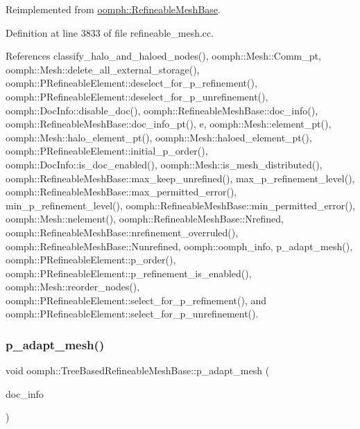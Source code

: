 Reimplemented from \hyperlink{classoomph_1_1RefineableMeshBase_a03222065e7dfe9eac96fbd58faf0e4ab}{oomph\+::\+Refineable\+Mesh\+Base}.



Definition at line 3833 of file refineable\+\_\+mesh.\+cc.



References classify\+\_\+halo\+\_\+and\+\_\+haloed\+\_\+nodes(), oomph\+::\+Mesh\+::\+Comm\+\_\+pt, oomph\+::\+Mesh\+::delete\+\_\+all\+\_\+external\+\_\+storage(), oomph\+::\+P\+Refineable\+Element\+::deselect\+\_\+for\+\_\+p\+\_\+refinement(), oomph\+::\+P\+Refineable\+Element\+::deselect\+\_\+for\+\_\+p\+\_\+unrefinement(), oomph\+::\+Doc\+Info\+::disable\+\_\+doc(), oomph\+::\+Refineable\+Mesh\+Base\+::doc\+\_\+info(), oomph\+::\+Refineable\+Mesh\+Base\+::doc\+\_\+info\+\_\+pt(), e, oomph\+::\+Mesh\+::element\+\_\+pt(), oomph\+::\+Mesh\+::halo\+\_\+element\+\_\+pt(), oomph\+::\+Mesh\+::haloed\+\_\+element\+\_\+pt(), oomph\+::\+P\+Refineable\+Element\+::initial\+\_\+p\+\_\+order(), oomph\+::\+Doc\+Info\+::is\+\_\+doc\+\_\+enabled(), oomph\+::\+Mesh\+::is\+\_\+mesh\+\_\+distributed(), oomph\+::\+Refineable\+Mesh\+Base\+::max\+\_\+keep\+\_\+unrefined(), max\+\_\+p\+\_\+refinement\+\_\+level(), oomph\+::\+Refineable\+Mesh\+Base\+::max\+\_\+permitted\+\_\+error(), min\+\_\+p\+\_\+refinement\+\_\+level(), oomph\+::\+Refineable\+Mesh\+Base\+::min\+\_\+permitted\+\_\+error(), oomph\+::\+Mesh\+::nelement(), oomph\+::\+Refineable\+Mesh\+Base\+::\+Nrefined, oomph\+::\+Refineable\+Mesh\+Base\+::nrefinement\+\_\+overruled(), oomph\+::\+Refineable\+Mesh\+Base\+::\+Nunrefined, oomph\+::oomph\+\_\+info, p\+\_\+adapt\+\_\+mesh(), oomph\+::\+P\+Refineable\+Element\+::p\+\_\+order(), oomph\+::\+P\+Refineable\+Element\+::p\+\_\+refinement\+\_\+is\+\_\+enabled(), oomph\+::\+Mesh\+::reorder\+\_\+nodes(), oomph\+::\+P\+Refineable\+Element\+::select\+\_\+for\+\_\+p\+\_\+refinement(), and oomph\+::\+P\+Refineable\+Element\+::select\+\_\+for\+\_\+p\+\_\+unrefinement().

\mbox{\label{classoomph_1_1TreeBasedRefineableMeshBase_a5d714967dc71ba477c2ca807bbf6d6bd}} 
\subsubsection{\texorpdfstring{p\+\_\+adapt\+\_\+mesh()}{p\_adapt\_mesh()}\hspace{0.1cm}{\footnotesize\ttfamily [1/2]}}
{\footnotesize\ttfamily void oomph\+::\+Tree\+Based\+Refineable\+Mesh\+Base\+::p\+\_\+adapt\+\_\+mesh (\begin{DoxyParamCaption}\item[{\hyperlink{classoomph_1_1DocInfo}{Doc\+Info} \&}]{doc\+\_\+info }\end{DoxyParamCaption})}



